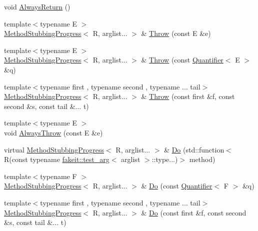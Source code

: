 \begin{DoxyCompactItemize}
\item 
void \mbox{\hyperlink{structfakeit_1_1MethodStubbingProgress_a3f1ecf87f8c73b7f3276786914579f8b}{Always\+Return}} ()
\item 
{\footnotesize template$<$typename E $>$ }\\\mbox{\hyperlink{structfakeit_1_1MethodStubbingProgress}{Method\+Stubbing\+Progress}}$<$ R, arglist... $>$ \& \mbox{\hyperlink{structfakeit_1_1MethodStubbingProgress_ae3da30d02ba5de4bfa82f51bba5602c3}{Throw}} (const E \&e)
\item 
{\footnotesize template$<$typename E $>$ }\\\mbox{\hyperlink{structfakeit_1_1MethodStubbingProgress}{Method\+Stubbing\+Progress}}$<$ R, arglist... $>$ \& \mbox{\hyperlink{structfakeit_1_1MethodStubbingProgress_a93c74210adfc0ec4662aff15f78834c7}{Throw}} (const \mbox{\hyperlink{structfakeit_1_1Quantifier}{Quantifier}}$<$ E $>$ \&q)
\item 
{\footnotesize template$<$typename first , typename second , typename ... tail$>$ }\\\mbox{\hyperlink{structfakeit_1_1MethodStubbingProgress}{Method\+Stubbing\+Progress}}$<$ R, arglist... $>$ \& \mbox{\hyperlink{structfakeit_1_1MethodStubbingProgress_a516a0ade529c61e4ab6df1bf47f3f1b2}{Throw}} (const first \&f, const second \&s, const tail \&... t)
\item 
{\footnotesize template$<$typename E $>$ }\\void \mbox{\hyperlink{structfakeit_1_1MethodStubbingProgress_a4efb736b0529123d9c5ed87630e11ac2}{Always\+Throw}} (const E \&e)
\item 
virtual \mbox{\hyperlink{structfakeit_1_1MethodStubbingProgress}{Method\+Stubbing\+Progress}}$<$ R, arglist... $>$ \& \mbox{\hyperlink{structfakeit_1_1MethodStubbingProgress_a9ef4c2db8e567aa312b708613d240ae1}{Do}} (std\+::function$<$ R(const typename \mbox{\hyperlink{structfakeit_1_1test__arg}{fakeit\+::test\+\_\+arg}}$<$ arglist $>$\+::type...)$>$ method)
\item 
{\footnotesize template$<$typename F $>$ }\\\mbox{\hyperlink{structfakeit_1_1MethodStubbingProgress}{Method\+Stubbing\+Progress}}$<$ R, arglist... $>$ \& \mbox{\hyperlink{structfakeit_1_1MethodStubbingProgress_a59f9d7ab7c86b809ce25b41d05b58ad2}{Do}} (const \mbox{\hyperlink{structfakeit_1_1Quantifier}{Quantifier}}$<$ F $>$ \&q)
\item 
{\footnotesize template$<$typename first , typename second , typename ... tail$>$ }\\\mbox{\hyperlink{structfakeit_1_1MethodStubbingProgress}{Method\+Stubbing\+Progress}}$<$ R, arglist... $>$ \& \mbox{\hyperlink{structfakeit_1_1MethodStubbingProgress_a157561400e37da65c5b48f4466fc603c}{Do}} (const first \&f, const second \&s, const tail \&... t)

\end{DoxyCompactItemize}
